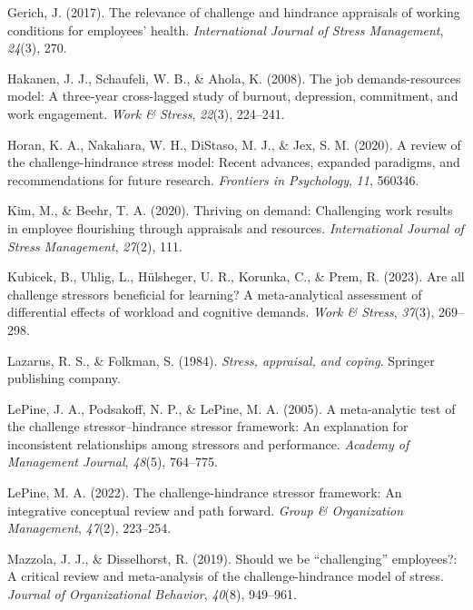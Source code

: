 \documentclass[
  man]{apa7}
\newlength{\cslhangindent}
\newenvironment{CSLReferences}[2] %
 {\begin{list}{}{%
  \setlength{\itemindent}{0pt}
  \setlength{\leftmargin}{0pt}
  \setlength{\parsep}{0pt}
  \ifodd #1
   \setlength{\leftmargin}{\cslhangindent}
   \setlength{\itemindent}{-1\cslhangindent}
  \fi
  \setlength{\itemsep}{#2\baselineskip}}}
 {\end{list}}
\begin{document}
\begin{CSLReferences}{1}{0}
Gerich, J. (2017). The relevance of challenge and hindrance appraisals of working conditions for employees' health. \emph{International Journal of Stress Management}, \emph{24}(3), 270.

Hakanen, J. J., Schaufeli, W. B., \& Ahola, K. (2008). The job demands-resources model: A three-year cross-lagged study of burnout, depression, commitment, and work engagement. \emph{Work \& Stress}, \emph{22}(3), 224--241.

Horan, K. A., Nakahara, W. H., DiStaso, M. J., \& Jex, S. M. (2020). A review of the challenge-hindrance stress model: Recent advances, expanded paradigms, and recommendations for future research. \emph{Frontiers in Psychology}, \emph{11}, 560346.

Kim, M., \& Beehr, T. A. (2020). Thriving on demand: Challenging work results in employee flourishing through appraisals and resources. \emph{International Journal of Stress Management}, \emph{27}(2), 111.

Kubicek, B., Uhlig, L., Hülsheger, U. R., Korunka, C., \& Prem, R. (2023). Are all challenge stressors beneficial for learning? A meta-analytical assessment of differential effects of workload and cognitive demands. \emph{Work \& Stress}, \emph{37}(3), 269--298.

Lazarus, R. S., \& Folkman, S. (1984). \emph{Stress, appraisal, and coping}. Springer publishing company.

LePine, J. A., Podsakoff, N. P., \& LePine, M. A. (2005). A meta-analytic test of the challenge stressor--hindrance stressor framework: An explanation for inconsistent relationships among stressors and performance. \emph{Academy of Management Journal}, \emph{48}(5), 764--775.

LePine, M. A. (2022). The challenge-hindrance stressor framework: An integrative conceptual review and path forward. \emph{Group \& Organization Management}, \emph{47}(2), 223--254.

Mazzola, J. J., \& Disselhorst, R. (2019). Should we be {``challenging''} employees?: A critical review and meta-analysis of the challenge-hindrance model of stress. \emph{Journal of Organizational Behavior}, \emph{40}(8), 949--961.


\end{CSLReferences}
\end{document}
